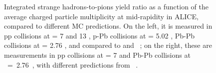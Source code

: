 \begin{figure}[t]
\hspace*{-1.25cm}
\caption{Integrated strange hadrons-to-pions yield ratio as a function of the average charged particle multiplicity at mid-rapidity in ALICE, compared to different MC predictions. On the left, it is measured in pp collisions at \sqrtS = 7 and 13 \tev, p-Pb collisions at \sqrtSnn = 5.02 \tev, Pb-Pb collisions at \sqrtSnn = 2.76 \tev , and compared to \Pythiaeight and \Herwig~\cite{acharyaMultiplicityDependencePi2020}; on the right, these are measurements in pp collisions at \sqrtS = 7 \tev and Pb-Pb collisions at \sqrtSnn~=~2.76~\tev, with different predictions from \Epos~\cite{wernerCorecoronaProcedureMicrocanonical2023}.}
	\label{fig:MCModelStrangenessEnhancement}
\end{figure}

